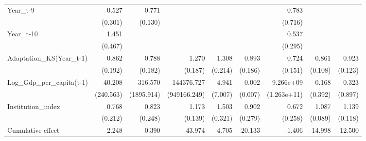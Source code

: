 \begin{table}[htbp]
\begin{tabular}{l*{8}{D{.}{.}{-1}}}
Year\_t-9            &       0.527         &       0.771\sym{\%}  &                     &                     &                     &       0.783         &                     &                     \\
                    &     (0.301)         &     (0.130)         &                     &                     &                     &     (0.716)         &                     &                     \\
Year\_t-10           &       1.451         &                     &                     &                     &                     &       0.537         &                     &                     \\
                    &     (0.467)         &                     &                     &                     &                     &     (0.295)         &                     &                     \\
Adaptation\_KS(Year\_t-1)&       0.862         &       0.788         &       1.270\sym{\%}  &       1.308\sym{\%}  &       0.893         &       0.724\sym{\%}  &       0.861         &       0.923         \\
                    &     (0.192)         &     (0.182)         &     (0.187)         &     (0.214)         &     (0.186)         &     (0.151)         &     (0.108)         &     (0.123)         \\
Log\_Gdp\_per\_capita(t-1)&      40.208         &     316.570         &  144376.727\sym{*}  &       4.941         &       0.002\sym{\%}  &   9.266e+09\sym{*}  &       0.168         &       0.323         \\
                    &   (240.563)         &  (1895.914)         &(949166.249)         &     (7.007)         &     (0.007)         & (1.263e+11)         &     (0.392)         &     (0.897)         \\
Institution\_index   &       0.768         &       0.823         &       1.173         &       1.503\sym{*}  &       0.902         &       0.672         &       1.087         &       1.139         \\
                    &     (0.212)         &     (0.248)         &     (0.139)         &     (0.321)         &     (0.279)         &     (0.258)         &     (0.089)         &     (0.118)         \\
\midrule
Cumulative effect   &       2.248         &       0.390         &      43.974         &      -4.705         &      20.133         &      -1.406         &     -14.998         &     -12.500         \\

\end{tabular}
\end{table}
